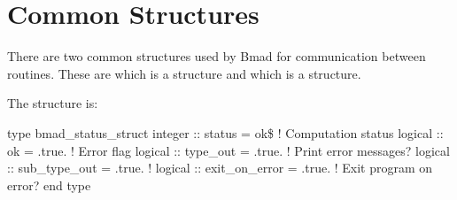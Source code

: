 \section{Common Structures}
\label{s:common.struct}


There are two common structures used by Bmad for communication between
routines. These are  which is a 
structure and  which is a 
structure.


The  structure is:
\begin{example}
type bmad_status_struct
  integer :: status         = ok\$     ! Computation status 
  logical :: ok             = .true.   ! Error flag
  logical :: type_out       = .true.   ! Print error messages?
  logical :: sub_type_out   = .true.   ! 
  logical :: exit_on_error  = .true.   ! Exit program on error?
end type
\end{example}




